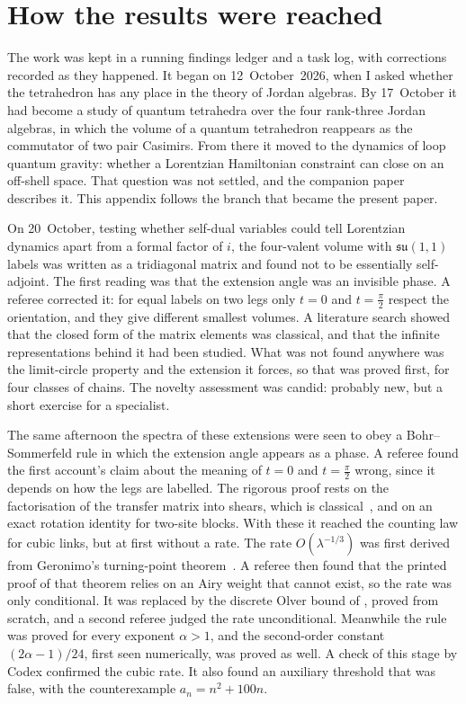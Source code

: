 \section{How the results were reached}
\label{app:provenance}

The work was kept in a running findings ledger and a task log, with corrections recorded as
they happened. It began on 12~October~2026, when I asked whether the tetrahedron has any
place in the theory of Jordan algebras. By 17~October it had become a study of quantum
tetrahedra over the four rank-three Jordan algebras, in which the volume of a quantum
tetrahedron reappears as the commutator of two pair Casimirs. From there it moved to the
dynamics of loop quantum gravity: whether a Lorentzian Hamiltonian constraint can close on
an off-shell space. That question was not settled, and the companion
paper~\cite{FitchVolumeGap} describes it. This appendix follows the branch that became the
present paper.

On 20~October, testing whether self-dual variables could tell Lorentzian dynamics apart from
a formal factor of $i$, the four-valent volume with $\mathfrak{su}(1,1)$ labels was written
as a tridiagonal matrix and found not to be essentially self-adjoint. The first reading was
that the extension angle was an invisible phase. A referee corrected it: for equal labels on
two legs only $t=0$ and $t=\frac\pi2$ respect the orientation, and they give different
smallest volumes. A literature search showed that the closed form of the matrix elements was
classical, and that the infinite representations behind it had been studied. What was not
found anywhere was the limit-circle property and the extension it forces, so that was proved
first, for four classes of chains. The novelty assessment was candid: probably new, but a
short exercise for a specialist.

The same afternoon the spectra of these extensions were seen to obey a Bohr--Sommerfeld rule
in which the extension angle appears as a phase. A referee found the first account's claim
about the meaning of $t=0$ and $t=\frac\pi2$ wrong, since it depends on how the legs are
labelled. The rigorous proof rests on the factorisation of the transfer matrix into shears,
which is classical~\cite{Kac1999}, and on an exact rotation identity for two-site blocks.
With these it reached the counting law for cubic links, but at first without a rate. The
rate $O(\lambda^{-1/3})$ was first derived from Geronimo's turning-point
theorem~\cite{Geronimo2009}. A referee then found that the printed proof of that theorem
relies on an Airy weight that cannot exist, so the rate was only conditional. It was
replaced by the discrete Olver bound of , proved from scratch, and a second
referee judged the rate unconditional. Meanwhile the rule was proved for every exponent
$\alpha>1$, and the second-order constant $(2\alpha-1)/24$, first seen numerically, was
proved as well. A check of this stage by Codex confirmed the cubic rate. It also found an
auxiliary threshold that was false, with the counterexample $a_n=n^2+100n$.

